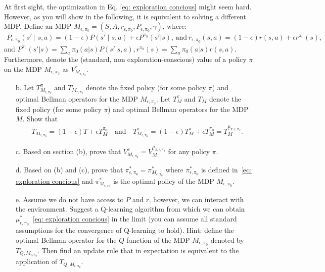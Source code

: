 At first sight, the optimization in Eq. \eqref{eq: exploration concious} might seem hard. However, as you will show in the following, it is equivalent to solving a different MDP. Define an MDP $M_{\epsilon,\pi_0} = (S,A,r_{\epsilon,\pi_0},P_{\epsilon,\pi_0},\gamma)$, where:
    \begin{align*}
        P_{\epsilon,\pi_0}(s'\mid s,a) = (1-\epsilon)P(s'\mid s,a) +\epsilon P^{\pi_0}(s'| s),\ \mathrm{and}\  r_{\epsilon,\pi_0}(s,a) = (1-\epsilon)r(s,a) +\epsilon r^{\pi_0}(s),
    \end{align*}
    and $P^{\pi_0}(s'| s)= \sum_{a}\pi_0(a|s) P(s'|s,a), r^{\pi_0}(s) = \sum_{a}\pi_0(a|s)r(s,a)$. Furthermore, denote the (standard, non exploration-conscious) value of a policy $\pi$ on the MDP $M_{\epsilon,\pi_0}$ as $V_{M_{\epsilon,\pi_0}}^\pi$.
\begin{enumerate}

    
    \item[b. ] Let $T^\pi_{M_{\epsilon,\pi_0}}$ and $T_{M_{\epsilon,\pi_0}}$ denote the fixed policy (for some policy $\pi$) and optimal Bellman operators for the MDP $M_{\epsilon,\pi_0}$.  Let $T_M^\pi$ and $T_M$ denote the fixed policy (for some policy $\pi$) and optimal Bellman operators for the MDP $M$. Show that
     \begin{align*}
         &T_{M_{\epsilon,\pi_0}} = (1-\epsilon)T +\epsilon T^{\pi_0}_M\quad  \mathrm{and}\quad T^\pi_{M_{\epsilon,\pi_0}} = (1-\epsilon)T^\pi_M +\epsilon T^{\pi_0}_M= T^{\mu_{\pi,\epsilon,\pi_0}}_M.
     \end{align*}
    
    \item[c.] Based on section (b), prove that $V_{M_{\epsilon,\pi_0}}^\pi = V_M^{\mu_{\pi,\epsilon,\pi_0}}$ for any policy $\pi$. 
    
    \item[d.] Based on (b) and (c), prove that $\pi_{\epsilon,\pi_0}^* = \pi^*_{M_{\epsilon,\pi_0}}$ where $\pi_{\epsilon,\pi_0}^*$ is defined in~\eqref{eq: exploration concious} and $\pi^*_{M_{\epsilon,\pi_0}}$ is the optimal policy of the MDP $M_{\epsilon,\pi_0}$. 

    \item[e. ] Assume we do not have access to $P$ and $r$, however, we can interact with the environment. Suggest a Q-learning algorithm from which we can obtain $\mu^*_{\epsilon,\pi_0}$~\eqref{eq: exploration concious} in the limit (you can assume all standard assumptions for the convergence of Q-learning to hold). Hint: define the optimal Bellman operator for the $Q$ function of the MDP $M_{\epsilon,\pi_0}$ denoted by $T_{Q,M_{\epsilon,\pi_0}}$. Then find an update rule that in expectation is equivalent to the application of $T_{Q,M_{\epsilon,\pi_0}}$.

\end{enumerate}
